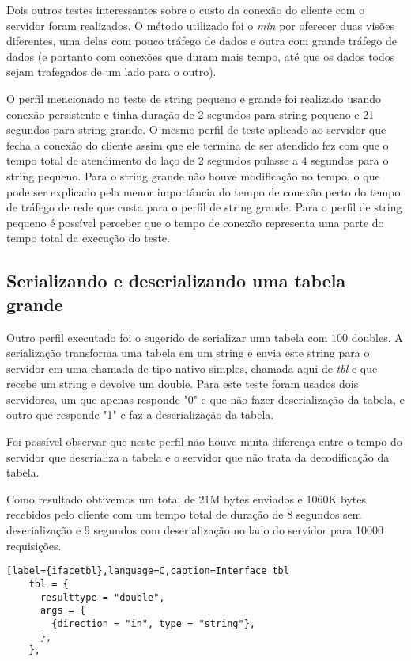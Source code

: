 \documentclass[11pt]{article}
\begin{document}
Dois outros testes interessantes sobre o custo da conexão do cliente com o
servidor foram realizados. O método utilizado foi o \textit{min} por oferecer
duas visões diferentes, uma delas com pouco tráfego de dados e outra com grande
tráfego de dados (e portanto com conexões que duram mais tempo, até que os dados
todos sejam trafegados de um lado para o outro).

O perfil mencionado no teste de string pequeno e grande foi realizado usando
conexão persistente e tinha duração de 2 segundos para string pequeno e 21
segundos para string grande. O mesmo perfil de teste aplicado ao servidor que fecha a conexão do cliente
assim que ele termina de ser atendido fez com que o tempo total de atendimento
do laço de 2 segundos pulasse a 4 segundos para o string pequeno. Para
o string grande não houve modificação no tempo, o que pode ser explicado pela
menor importância do tempo de conexão perto do tempo de tráfego de rede que
custa para o perfil de string grande. Para o perfil de string pequeno é possível
perceber que o tempo de conexão representa uma parte do tempo total da execução
do teste.

\subsection{Serializando e deserializando uma tabela grande}\label{subsec:serdeser}

Outro perfil executado foi o sugerido de serializar uma tabela com 100 doubles.
A serialização transforma uma tabela em um string e envia este string para o
servidor em uma chamada de tipo nativo simples, chamada aqui de \textit{tbl} e
que recebe um string e devolve um double. Para este teste foram usados dois
servidores, um que apenas responde "0" e que não fazer deserialização da tabela,
e outro que responde "1" e faz a deserialização da tabela.

Foi possível observar que neste perfil não houve muita diferença entre o tempo
do servidor que deserializa a tabela e o servidor que não trata da decodificação
da tabela.

Como resultado obtivemos um total de 21M bytes enviados e 1060K bytes recebidos pelo
cliente com um tempo total de duração de 8 segundos sem deserialização e 9
segundos com deserialização no lado do servidor para 10000 requisições.

\begin{lstlisting}[label={ifacetbl},language=C,caption=Interface tbl
    tbl = {
      resulttype = "double",
      args = {
        {direction = "in", type = "string"},
      },
    },
\end{lstlisting}
\end{document}
